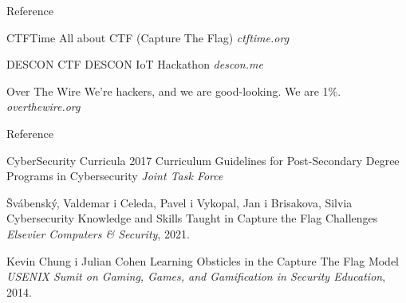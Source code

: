 \documentclass[aspectratio=169,xcolor=dvipsnames]{beamer}
\begin{document}

\begin{frame}{Reference}
    \footnotesize{
        \begin{thebibliography}{99}
             CTFTime
                \newblock All about CTF (Capture The Flag)
                \newblock \emph{ctftime.org}

             DESCON CTF
                \newblock DESCON IoT Hackathon
                \newblock \emph{descon.me}

             Over The Wire
                \newblock We're hackers, and we are good-looking. We are 1\%.
                \newblock \emph{overthewire.org}

        \end{thebibliography}
    }
\end{frame}


\begin{frame}{Reference}
    \footnotesize{
        \begin{thebibliography}{99}
             CyberSecurity Curricula 2017
                \newblock Curriculum Guidelines for Post-Secondary Degree
                Programs in Cybersecurity
                \newblock \emph{Joint Task Force}

             Švábenský, Valdemar i 
                Celeda, Pavel i Vykopal, Jan i Brisakova, Silvia
                \newblock Cybersecurity Knowledge and Skills Taught in 
                Capture the Flag Challenges
                \newblock \emph{Elsevier Computers \& Security}, 2021.

             Kevin Chung i Julian Cohen
                \newblock Learning Obsticles in the Capture The Flag Model
                \newblock \emph{USENIX Sumit on Gaming, Games, and 
                Gamification in Security Education}, 2014.

        \end{thebibliography}
    }
\end{frame}

\end{document}
